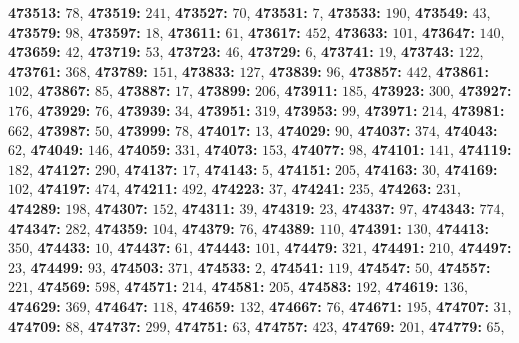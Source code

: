 \textsf{\bfseries 473513:} $78$, \textsf{\bfseries 473519:} $241$, \textsf{\bfseries 473527:} $70$, \textsf{\bfseries 473531:} $7$, \textsf{\bfseries 473533:} $190$, \textsf{\bfseries 473549:} $43$, \textsf{\bfseries 473579:} $98$, \textsf{\bfseries 473597:} $18$, \textsf{\bfseries 473611:} $61$, \textsf{\bfseries 473617:} $452$, \textsf{\bfseries 473633:} $101$, \textsf{\bfseries 473647:} $140$, \textsf{\bfseries 473659:} $42$, \textsf{\bfseries 473719:} $53$, \textsf{\bfseries 473723:} $46$, \textsf{\bfseries 473729:} $6$, \textsf{\bfseries 473741:} $19$, \textsf{\bfseries 473743:} $122$, \textsf{\bfseries 473761:} $368$, \textsf{\bfseries 473789:} $151$, \textsf{\bfseries 473833:} $127$, \textsf{\bfseries 473839:} $96$, \textsf{\bfseries 473857:} $442$, \textsf{\bfseries 473861:} $102$, \textsf{\bfseries 473867:} $85$, \textsf{\bfseries 473887:} $17$, \textsf{\bfseries 473899:} $206$, \textsf{\bfseries 473911:} $185$, \textsf{\bfseries 473923:} $300$, \textsf{\bfseries 473927:} $176$, \textsf{\bfseries 473929:} $76$, \textsf{\bfseries 473939:} $34$, \textsf{\bfseries 473951:} $319$, \textsf{\bfseries 473953:} $99$, \textsf{\bfseries 473971:} $214$, \textsf{\bfseries 473981:} $662$, \textsf{\bfseries 473987:} $50$, \textsf{\bfseries 473999:} $78$, \textsf{\bfseries 474017:} $13$, \textsf{\bfseries 474029:} $90$, \textsf{\bfseries 474037:} $374$, \textsf{\bfseries 474043:} $62$, \textsf{\bfseries 474049:} $146$, \textsf{\bfseries 474059:} $331$, \textsf{\bfseries 474073:} $153$, \textsf{\bfseries 474077:} $98$, \textsf{\bfseries 474101:} $141$, \textsf{\bfseries 474119:} $182$, \textsf{\bfseries 474127:} $290$, \textsf{\bfseries 474137:} $17$, \textsf{\bfseries 474143:} $5$, \textsf{\bfseries 474151:} $205$, \textsf{\bfseries 474163:} $30$, \textsf{\bfseries 474169:} $102$, \textsf{\bfseries 474197:} $474$, \textsf{\bfseries 474211:} $492$, \textsf{\bfseries 474223:} $37$, \textsf{\bfseries 474241:} $235$, \textsf{\bfseries 474263:} $231$, \textsf{\bfseries 474289:} $198$, \textsf{\bfseries 474307:} $152$, \textsf{\bfseries 474311:} $39$, \textsf{\bfseries 474319:} $23$, \textsf{\bfseries 474337:} $97$, \textsf{\bfseries 474343:} $774$, \textsf{\bfseries 474347:} $282$, \textsf{\bfseries 474359:} $104$, \textsf{\bfseries 474379:} $76$, \textsf{\bfseries 474389:} $110$, \textsf{\bfseries 474391:} $130$, \textsf{\bfseries 474413:} $350$, \textsf{\bfseries 474433:} $10$, \textsf{\bfseries 474437:} $61$, \textsf{\bfseries 474443:} $101$, \textsf{\bfseries 474479:} $321$, \textsf{\bfseries 474491:} $210$, \textsf{\bfseries 474497:} $23$, \textsf{\bfseries 474499:} $93$, \textsf{\bfseries 474503:} $371$, \textsf{\bfseries 474533:} $2$, \textsf{\bfseries 474541:} $119$, \textsf{\bfseries 474547:} $50$, \textsf{\bfseries 474557:} $221$, \textsf{\bfseries 474569:} $598$, \textsf{\bfseries 474571:} $214$, \textsf{\bfseries 474581:} $205$, \textsf{\bfseries 474583:} $192$, \textsf{\bfseries 474619:} $136$, \textsf{\bfseries 474629:} $369$, \textsf{\bfseries 474647:} $118$, \textsf{\bfseries 474659:} $132$, \textsf{\bfseries 474667:} $76$, \textsf{\bfseries 474671:} $195$, \textsf{\bfseries 474707:} $31$, \textsf{\bfseries 474709:} $88$, \textsf{\bfseries 474737:} $299$, \textsf{\bfseries 474751:} $63$, \textsf{\bfseries 474757:} $423$, \textsf{\bfseries 474769:} $201$, \textsf{\bfseries 474779:} $65$, 
